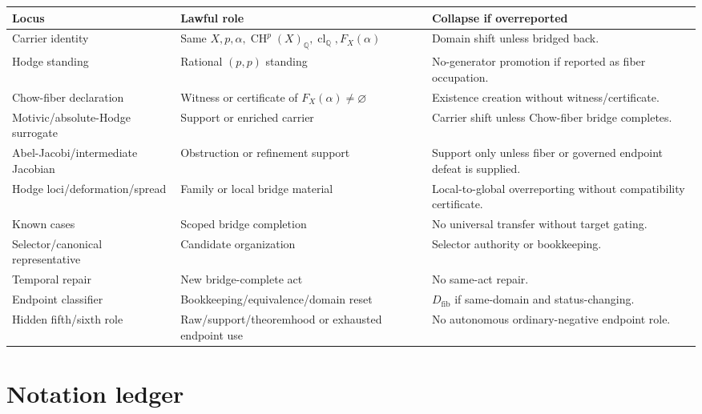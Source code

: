 \documentclass[11pt]{article}
\newcommand{\QQ}{\mathbb{Q}}
\newcommand{\CH}{\operatorname{CH}}
\newcommand{\clQ}{\operatorname{cl}_{\QQ}}
\begin{document}
{\scriptsize
\begin{longtable}{p{}p{}p{}}
\toprule
Locus & Lawful role & Collapse if overreported\\
\midrule
\endhead
Carrier identity & Same $X,p,\alpha,\CH^p(X)_\QQ,\clQ,F_X(\alpha)$ & Domain shift unless bridged back.\\
Hodge standing & Rational $(p,p)$ standing & No-generator promotion if reported as fiber occupation.\\
Chow-fiber declaration & Witness or certificate of $F_X(\alpha)\neq\varnothing$ & Existence creation without witness/certificate.\\
Motivic/absolute-Hodge surrogate & Support or enriched carrier & Carrier shift unless Chow-fiber bridge completes.\\
Abel-Jacobi/intermediate Jacobian & Obstruction or refinement support & Support only unless fiber or governed endpoint defeat is supplied.\\
Hodge loci/deformation/spread & Family or local bridge material & Local-to-global overreporting without compatibility certificate.\\
Known cases & Scoped bridge completion & No universal transfer without target gating.\\
Selector/canonical representative & Candidate organization & Selector authority or bookkeeping.\\
Temporal repair & New bridge-complete act & No same-act repair.\\
Endpoint classifier & Bookkeeping/equivalence/domain reset & $D_{\mathrm{fib}}$ if same-domain and status-changing.\\
Hidden fifth/sixth role & Raw/support/theoremhood or exhausted endpoint use & No autonomous ordinary-negative endpoint role.\\
\bottomrule
\end{longtable}
}

\section{Notation ledger}\label{app:notation}
\end{document}
